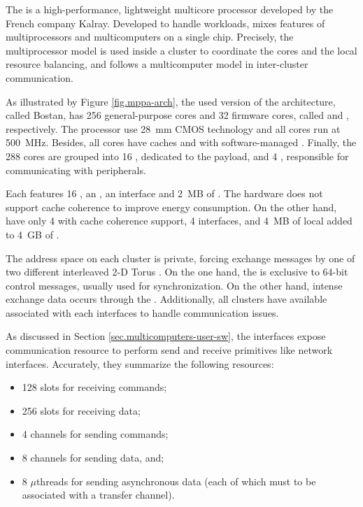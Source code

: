	The \mppa is a high-performance, lightweight multicore processor
	developed by the French company Kalray.
	Developed to handle \mimd workloads, \mppa mixes features of
	multiprocessors and multicomputers on a single chip.
	Precisely, the multiprocessor model is used inside a cluster
	to coordinate the cores and the local resource balancing, and
	follows a multicomputer model in inter-cluster communication.

	As illustrated by Figure \ref{fig.mppa-arch}, the used version of
	the architecture, called Bostan, has 256 general-purpose cores and
	32 firmware cores, called \pes and \rmans, respectively.
	The processor use 28~mm CMOS technology and all cores run at 500~MHz.
	Besides, all cores have caches and \mmus with software-managed \tlbs.
	Finally, the 288 cores are grouped into 16 \cclusters, dedicated to
	the payload, and 4 \ioclusters, responsible for communicating with peripherals.

	Each \ccluster features 16 \pes, an \rman, an \noc interface and 2~MB of \sram.
	The hardware does not support cache coherence to improve energy consumption.
	On the other hand, \ioclusters have only 4 \rmans with cache coherence support,
	4 \noc interfaces, and 4~MB of local \sram added to 4~GB of \dram.

	The address space on each cluster is private, forcing exchange messages
	by one of two different interleaved 2-D Torus \nocs.
	On the one hand, the \cnoc is exclusive to 64-bit control messages,
	usually used for synchronization.
	On the other hand, intense exchange data occurs through the \dnoc.
	Additionally, all clusters have available \dmas associated with each
	\noc interfaces to handle communication issues.

	As discussed in Section \ref{sec.multicomputers-user-sw}, the \noc interfaces
	expose communication resource to perform send and receive primitives
	like network interfaces.
	Accurately, they summarize the following resources:

	\begin{itemize}
		\item 128 slots for receiving commands;
		\item 256 slots for receiving data;
		\item 4 channels for sending commands;
		\item 8 channels for sending data, and;
		\item 8 $\mu$threads for sending asynchronous data (each of which must
			to be associated with a transfer channel).
	\end{itemize}

